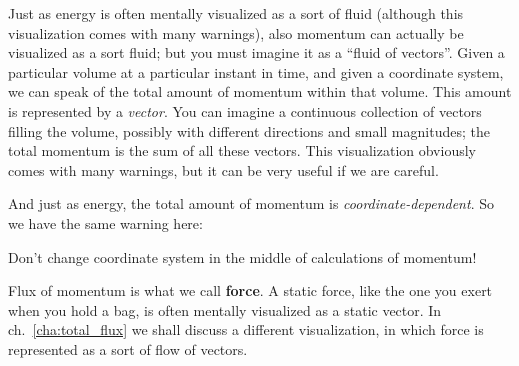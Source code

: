 \documentclass[a4paper,12pt,%
onecolumn,oneside,titlepage,%
british%
]{memoir}
\renewcommand*{\|}[1][]{\nonscript\:#1\vert\nonscript\:\mathopen{}}
\newcommand*{\chap}{ch.}%
\begin{document}
Just as energy is often mentally visualized as a sort of fluid (although this visualization comes with many warnings), also momentum can actually be visualized as a sort fluid; but you must imagine it as a \enquote{fluid of vectors}.
Given a particular volume at a particular instant in time, and given a coordinate system, we can speak of the total amount of momentum within that volume. This amount is represented by a \emph{vector}. You can imagine a continuous collection of vectors filling the volume, possibly with different directions and small magnitudes; the total momentum is the sum of all these vectors. This visualization obviously comes with many warnings, but it can be very useful if we are careful.

And just as energy, the total amount of momentum is \emph{coordinate-dependent}. So we have the same warning here:
\begin{warning}
  Don't change coordinate system in the middle of calculations of momentum!
\end{warning}


Flux of momentum is what we call \textbf{force}. A static force, like the one you exert when you hold a bag, is often mentally visualized as a static vector. In \chap~\ref{cha:total_flux} we shall discuss a different visualization, in which force is represented as a sort of flow of vectors.
\end{document}

